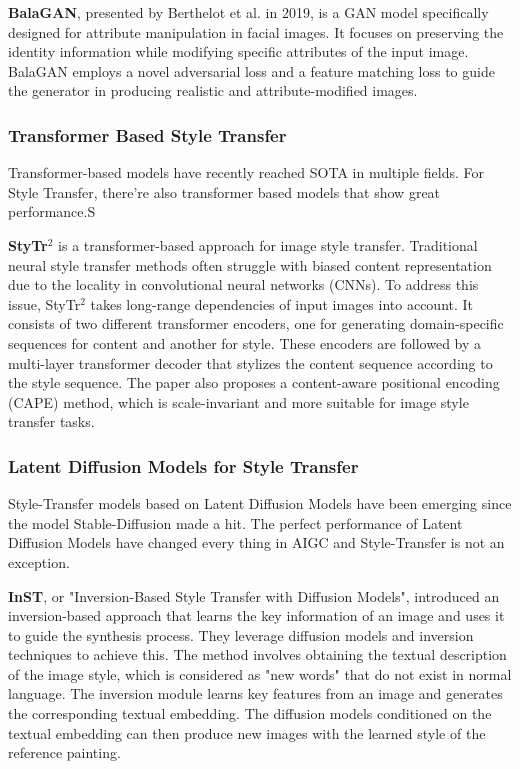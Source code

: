\documentclass[conference]{IEEEtran}
\begin{document}
\textbf{BalaGAN}\cite{bala}, presented by Berthelot et al. in 2019, is a GAN model specifically designed for attribute manipulation in facial images. It focuses on preserving the identity information while modifying specific attributes of the input image. BalaGAN employs a novel adversarial loss and a feature matching loss to guide the generator in producing realistic and attribute-modified images.


\subsubsection{Transformer Based Style Transfer}
Transformer-based models have recently reached SOTA in multiple fields. For Style Transfer, there're also transformer based models that show great performance.S

\textbf{StyTr$^2$}\cite{stytr} is a transformer-based approach for image style transfer. Traditional neural style transfer methods often struggle with biased content representation due to the locality in convolutional neural networks (CNNs). To address this issue, StyTr$^2$ takes long-range dependencies of input images into account. It consists of two different transformer encoders, one for generating domain-specific sequences for content and another for style. These encoders are followed by a multi-layer transformer decoder that stylizes the content sequence according to the style sequence. The paper also proposes a content-aware positional encoding (CAPE) method, which is scale-invariant and more suitable for image style transfer tasks. 

\subsubsection{Latent Diffusion Models for Style Transfer} 
Style-Transfer models based on Latent Diffusion Models have been emerging since the model Stable-Diffusion made a hit. The perfect performance of Latent Diffusion Models have changed every thing in AIGC and Style-Transfer is not an exception.

\textbf{InST}\cite{inst}, or "Inversion-Based Style Transfer with Diffusion Models", introduced an inversion-based approach that learns the key information of an image and uses it to guide the synthesis process. They leverage diffusion models and inversion techniques to achieve this. The method involves obtaining the textual description of the image style, which is considered as "new words" that do not exist in normal language. The inversion module learns key features from an image and generates the corresponding textual embedding. The diffusion models conditioned on the textual embedding can then produce new images with the learned style of the reference painting.
\end{document}
